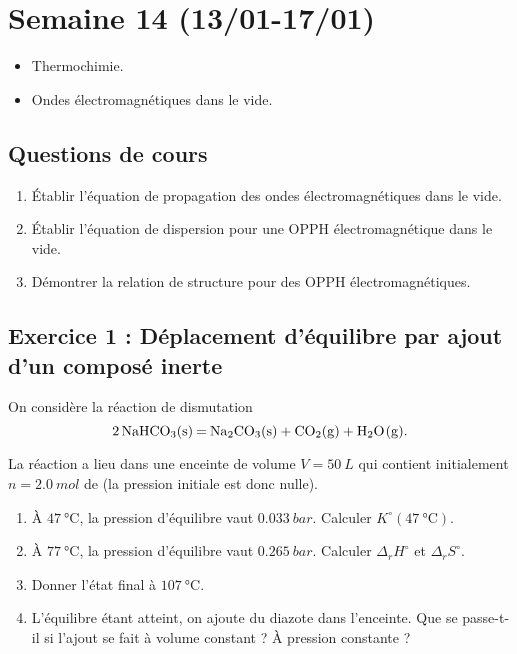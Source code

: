\section{Semaine 14 (13/01-17/01) }

\begin{itemize}
	\item Thermochimie.
	\item Ondes électromagnétiques dans le vide.
\end{itemize}

\subsection{Questions de cours}

\begin{enumerate}
	\item Établir l'équation de propagation des ondes électromagnétiques dans le vide.
	\item Établir l'équation de dispersion pour une OPPH électromagnétique dans le vide.
	\item Démontrer la relation de structure pour des OPPH électromagnétiques.
\end{enumerate}

\subsection{Exercice 1 : Déplacement d'équilibre par ajout d'un composé inerte}

On considère la réaction de dismutation $$\ce{2NaHCO3(s) = Na2CO3(s) + CO2(g) + H2O(g)}.$$

La réaction a lieu dans une enceinte de volume $V = \SI{50}{L}$ qui contient initialement $n = \SI{2.0}{mol}$ de  (la pression initiale est donc nulle).

\begin{enumerate}
	\item À $\SI{47}{\celsius}$, la pression d'équilibre vaut $\SI{0.033}{bar}$. Calculer $K^\circ(\SI{47}{\celsius})$.
	\item À $\SI{77}{\celsius}$, la pression d'équilibre vaut $\SI{0.265}{bar}$. Calculer $\Delta_rH^\circ$ et $\Delta_rS^\circ$.
	\item Donner l'état final à $\SI{107}{\celsius}$.
	\item L'équilibre étant atteint, on ajoute du diazote dans l'enceinte. Que se passe-t-il si l'ajout se fait à volume constant ? À pression constante ?
\end{enumerate}

